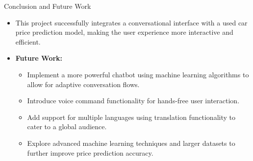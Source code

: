 \documentclass{beamer}
\begin{document}
\begin{frame}[t]{Conclusion and Future Work}
    \begin{itemize}
        \item This project successfully integrates a conversational interface with a used car price prediction model, making the user experience more interactive and efficient.
        \item \textbf{Future Work:}
        \begin{itemize}
            \item Implement a more powerful chatbot using machine learning algorithms to allow for adaptive conversation flows.
            \item Introduce voice command functionality for hands-free user interaction.
            \item Add support for multiple languages using translation functionality to cater to a global audience.
            \item Explore advanced machine learning techniques and larger datasets to further improve price prediction accuracy.
        \end{itemize}
    \end{itemize}
\end{frame}
\end{document}
